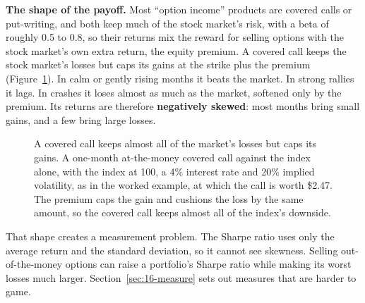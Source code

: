 \textbf{The shape of the payoff.} Most ``option income'' products are covered calls or put-writing, and both keep much of the stock market's risk, with a beta of roughly 0.5 to 0.8, so their returns mix the reward for selling options with the stock market's own extra return, the equity premium. A covered call keeps the stock market's losses but caps its gains at the strike plus the premium (Figure~\ref{fig:16-cc}). In calm or gently rising months it beats the market. In strong rallies it lags. In crashes it loses almost as much as the market, softened only by the premium. Its returns are therefore \textbf{negatively skewed}: most months bring small gains, and a few bring large losses.

\begin{figure}[htbp]
\centering
{}
\caption{A covered call keeps almost all of the market's losses but caps its gains. A one-month at-the-money covered call against the index alone, with the index at 100, a 4\% interest rate and 20\% implied volatility, as in the worked example, at which the call is worth \$2.47. The premium caps the gain and cushions the loss by the same amount, so the covered call keeps almost all of the index's downside.}
\label{fig:16-cc}
\end{figure}

That shape creates a measurement problem. The Sharpe ratio uses only the average return and the standard deviation, so it cannot see skewness. Selling out-of-the-money options can raise a portfolio's Sharpe ratio while making its worst losses much larger. Section~\ref{sec:16-measure} sets out measures that are harder to game.


